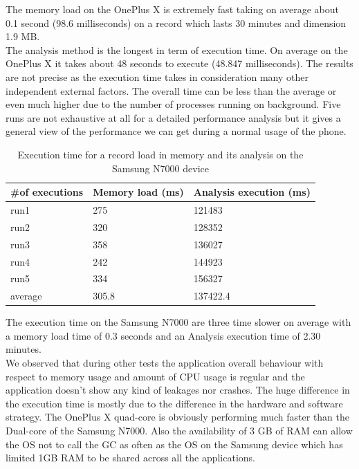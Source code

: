The memory load on the OnePlus X is extremely fast taking on average  about 0.1 second (98.6 milliseconds) on a record which lasts 30 minutes and dimension 1.9 MB. \\
The analysis method is the longest in term of execution time. On average on the OnePlus X it takes about 48 seconds to execute (48.847 milliseconds). The results are not precise as the execution time takes in consideration many other independent external factors. The overall time can be less than the average or even much higher due to the number of processes running on background. Five runs are  not exhaustive at all for a detailed performance analysis  but it gives a general view of the performance we can get during a normal usage of the phone.
\begin{table}
\begin{tabularx}{\textwidth}{|X|X|X|}
	 \hline
	\textbf{\#of executions} & \textbf{Memory load (ms)} &\textbf{Analysis execution (ms)}  \\ \hline
	run1 & 275 & 121483  \\ \hline
	run2 & 320 & 128352 \\ \hline
	run3 & 358 & 136027 \\ \hline
	run4 & 242 & 144923 \\ \hline
	run5 & 334 & 156327 \\ \hline
	average & 305.8 & 137422.4 \\ \hline

\end{tabularx}
	\caption{Execution time for a record load in memory and its analysis on the Samsung N7000 device}
	\label{tab10.3}
\end{table}
The execution time on the Samsung N7000 are three time slower on average  with a memory load time of 0.3 seconds and an Analysis execution time of 2.30 minutes.\\
We observed that during other tests the application overall behaviour with respect to memory usage and amount of CPU usage is regular and the application doesn’t show any kind of leakages nor crashes. The huge difference in the execution time is mostly due to the difference in the hardware and software strategy. The OnePlus X quad-core is obviously performing much faster than the Dual-core of the Samsung N7000. Also the availability of 3 GB of RAM can allow the OS  not to call the GC as often as the OS on the Samsung device which has limited 1GB RAM to be shared across all the applications.